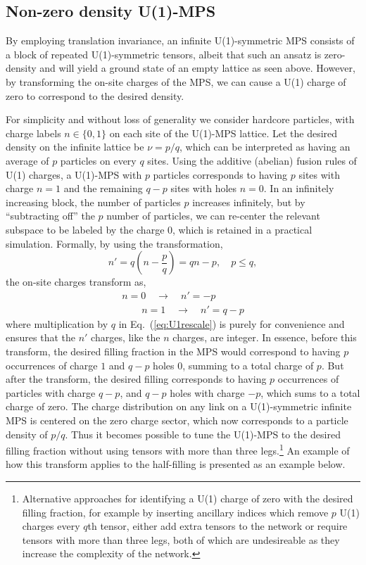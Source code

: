 \documentclass[aps,reprint,superscriptaddress,amsmath,amssymb,amsfonts,prb]{revtex4-1}
\begin{document}
\subsection{Non-zero density U(1)-MPS}
{By employing translation invariance, an infinite U(1){-symmetric} MPS consists of a block of repeated U(1)-symmetric tensors, albeit that {such an} ansatz is zero-density and will yield a ground state of an empty lattice {as seen above.} However, by transforming the on-site charges of the MPS, we can {cause a U(1) charge of zero to correspond to} the desired density. }

{For simplicity and without loss of generality we consider hardcore particles, with charge labels $n{\in\{0,1\}}$ on each site of the U(1)-MPS lattice. Let the desired density on the infinite lattice be $\nu=p/q$, which can be interpreted as having {an average of} $p$ particles on {every} $q$ sites. Using the additive (abelian) fusion rules of U(1) charges, a U(1)-MPS with $p$ particles corresponds to having $p$ sites with charge $n=1$ and the remaining $q-p$ sites with holes $n=0$. In an infinitely increasing block, the number of particles $p$ increases infinitely, but by ``subtracting off'' the $p$ number of particles, we can re-center the relevant subspace to be labeled by the charge $0$, which is retained in a practical simulation. Formally, by using the transformation, 
\begin{equation}
 n' = q\left(n-\frac{p}{q}\right)=qn - p, \quad p \leq q,\label{eq:U1rescale}
\end{equation}
the on-site charges transform as,
\begin{align}
 n=0 \quad \rightarrow \quad n' = -p \nonumber \\
 \quad \quad n=1 \quad \rightarrow \quad n'=q-p \nonumber
\end{align}
{where multiplication by $q$ in Eq.~(\ref{eq:U1rescale}) is purely for convenience and ensures that the $n'$ charges, like the $n$ charges, are integer.}
In essence, before this transform, the desired filling fraction in the MPS would correspond to having $p$ occurrences of charge $1$ and $q-p$ holes $0$, summing to a total charge of $p$. But after the transform, the desired filling corresponds to having $p$ occurrences of particles with charge $q-p$, and $q-p$ holes with charge $-p$, which sums to a total charge of zero. The charge distribution on any link on a U(1)-symmetric infinite MPS is centered on the zero charge sector{, which now corresponds to a particle density of {$p/q$}}. Thus it becomes possible to tune the U(1)-MPS to the desired filling {fraction} without using tensors with more than three legs.\footnote{Alternative approaches for identifying a U(1) charge of zero with the desired filling fraction, for example by inserting ancillary indices which remove $p$ U(1) charges every $q$th tensor, either add extra tensors to the network or require tensors with more than three legs, both of which are 
undesireable as they increase the complexity of the network.}
An example of how this transform applies to the half-filling is presented as an example below.} 
\end{document}
